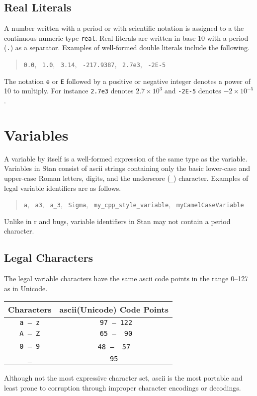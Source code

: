 \documentclass[10pt]{report}
\newcommand{\Stan}{Stan\xspace}
\newcommand{\acronym}[1]{{\sc #1}\xspace}
\newcommand{\ASCII}{\acronym{ascii}}
\newcommand{\R}{\acronym{r}}
\newcommand{\BUGS}{\acronym{bugs}}
\newcommand{\code}[1]{{\tt #1}}
\begin{document}
\subsection{Real Literals}

A number written with a period or with scientific notation is assigned
to a the continuous numeric type \code{real}.  Real literals are
written in base 10 with a period (\code{.}) as a separator.  Examples
of well-formed double literals include the following.
%
\begin{quote}
\code{0.0}, \ \code{1.0}, \ \code{3.14}, \ \code{-217.9387}, \ 
\code{2.7e3}, \ \code{-2E-5}
\end{quote}
%
The notation \code{e} or \code{E} followed by a positive or negative
integer denotes a power of 10 to multiply.  For instance \code{2.7e3}
denotes $2.7 \times 10^3$ and \code{-2E-5} denotes $-2 \times
10^{-5}$.


\section{Variables}

A variable by itself is a well-formed expression of the same type as
the variable.  Variables in \Stan consist of \ASCII strings containing
only the basic lower-case and upper-case Roman letters, digits, and
the underscore (\code{\_}) character.   Examples of legal variable
identifiers are as follows.
\begin{quote}
\code{a}, 
\ \code{a3}, 
\ \code{a\_3},
\ \code{Sigma}, 
\ \code{my\_cpp\_style\_variable},
\ \code{myCamelCaseVariable}
\end{quote}
%
Unlike in \R and \BUGS, variable identifiers in \Stan may not contain
a period character.

\subsection{Legal Characters}

The legal variable characters have the same \ASCII code points in the
range 0--127 as in Unicode.
%
\begin{center}
\begin{tabular}{cc}
Characters  & \ASCII (Unicode) Code Points
\\ \hline
\code{a -- z} & \code{{}~97 -- 122}
\\
\code{A -- Z} & \code{{}~65 -- {}~90}
\\
\code{0 -- 9} & \code{{}~48 -- {}~57}\
\\
\code{\_} & \code{95}
\end{tabular}
\end{center}
%
Although not the most expressive character set, \ASCII is the most
portable and least prone to corruption through improper character
encodings or decodings.
\end{document}
